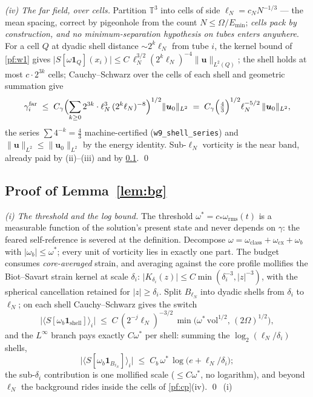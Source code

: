 \documentclass[11pt,letterpaper]{amsart}
\theoremstyle{definition}
\theoremstyle{remark}
\newcommand{\TT}{\mathbb{T}}
\newcommand{\om}{\omega}
\newcommand{\uu}{\boldsymbol{u}}
\newcommand{\norm}[1]{\lVert #1 \rVert}
\newcommand{\abs}[1]{\lvert #1 \rvert}
\begin{document}
\emph{(iv) The far field, over cells.} Partition $\TT^3$ into cells of side
$\ell_N=c_NN^{-1/3}$ --- the mean spacing, correct by pigeonhole from the count
$N\le\Omega/E_{\min}$; \emph{cells pack by construction, and no minimum-separation
hypothesis on tubes enters anywhere}. For a cell $Q$ at dyadic shell distance
$\sim2^k\ell_N$ from tube $i$, the kernel bound of \cref{pf:w1} gives
$\abs{S[\om\mathbf{1}_Q](x_i)}\le C\,\ell_N^{3/2}(2^k\ell_N)^{-4}\norm{\uu}_{L^2(Q)}$;
the shell holds at most $c\cdot2^{3k}$ cells; Cauchy--Schwarz over the cells of each
shell and geometric summation give
\[
\gamma_i^{\mathrm{far}}
\;\le\;C_\gamma\Bigl(\sum_{k\ge0}2^{3k}\cdot\ell_N^{3}\,(2^k\ell_N)^{-8}\Bigr)^{1/2}
\norm{\uu_0}_{L^2}
\;=\;C_\gamma\Bigl(\tfrac{4}{3}\Bigr)^{1/2}\ell_N^{-5/2}\,\norm{\uu_0}_{L^2},
\]
the series $\sum4^{-k}=\tfrac43$ machine-certified (\texttt{w9\_shell\_series}) and
$\norm{\uu}_{L^2}\le\norm{\uu_0}_{L^2}$ by the energy identity. Sub-$\ell_N$
vorticity is the near band, already paid by (ii)--(iii) and by
\cref{pf:bg}. \qed

\subsection{Proof of Lemma~\ref{lem:bg}}\label{pf:bg}
\emph{(i) The threshold and the log bound.} The threshold
$\om^*=c_*\om_{\mathrm{rms}}(t)$ is a measurable function of the solution's present
state and never depends on $\gamma$: the feared self-reference is severed at the
definition. Decompose $\om=\om_{\mathrm{class}}+\om_{\mathrm{cx}}+\om_b$ with
$\abs{\om_b}\le\om^*$; every unit of vorticity lies in exactly one part. The budget
consumes \emph{core-averaged} strain, and averaging against the core profile
mollifies the Biot--Savart strain kernel at scale $\delta_i$:
$\abs{K_{\delta_i}(z)}\le C\min(\delta_i^{-3},\abs{z}^{-3})$, with the spherical
cancellation retained for $\abs{z}\ge\delta_i$. Split $B_{\ell_N}$ into dyadic
shells from $\delta_i$ to $\ell_N$; on each shell Cauchy--Schwarz gives the switch
\[
\abs{\langle S[\om_b\mathbf{1}_{\mathrm{shell}}]\rangle_i}
\;\le\;C\,(2^{-j}\ell_N)^{-3/2}\,
\min\bigl(\om^*\,\mathrm{vol}^{1/2},\,(2\Omega)^{1/2}\bigr),
\]
and the $L^\infty$ branch pays exactly $C\om^*$ per shell: summing the
$\log_2(\ell_N/\delta_i)$ shells,
\[
\abs{\langle S[\om_b\mathbf{1}_{B_{\ell_N}}]\rangle_i}
\;\le\;C_b\,\om^*\,\log\bigl(e+\ell_N/\delta_i\bigr);
\]
the sub-$\delta_i$ contribution is one mollified scale ($\le C\om^*$, no
logarithm), and beyond $\ell_N$ the background rides inside the cells of
\cref{pf:cp}(iv). \qed\ (i)
\end{document}
